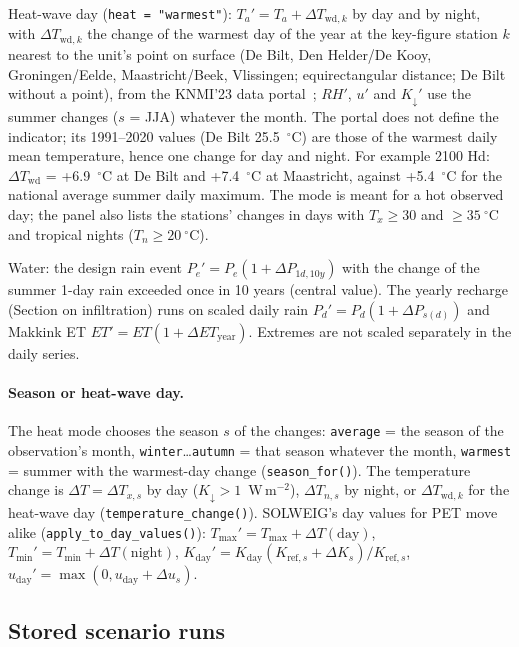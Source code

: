 \documentclass[11pt]{article}
\newcommand{\code}[1]{\texttt{#1}}
\begin{document}
Heat-wave day (\code{heat = "warmest"}): $T_a' = T_a + \Delta T_{\mathrm{wd},k}$ by day and by night, with $\Delta T_{\mathrm{wd},k}$ the change of the warmest day of the year at the key-figure station $k$ nearest to the unit's point on surface (De Bilt, Den Helder/De Kooy, Groningen/Eelde, Maastricht/Beek, Vlissingen; equirectangular distance; De Bilt without a point), from the KNMI'23 data portal~\cite{KNMI2023stations}; $RH'$, $u'$ and $K_\downarrow'$ use the summer changes ($s$ = JJA) whatever the month. The portal does not define the indicator; its 1991--2020 values (De Bilt 25.5~$^\circ$C) are those of the warmest daily mean temperature, hence one change for day and night. For example 2100 Hd: $\Delta T_{\mathrm{wd}}$ = +6.9~$^\circ$C at De Bilt and +7.4~$^\circ$C at Maastricht, against +5.4~$^\circ$C for the national average summer daily maximum. The mode is meant for a hot observed day; the panel also lists the stations' changes in days with $T_x \geq 30$ and $\geq 35~^\circ$C and tropical nights ($T_n \geq 20~^\circ$C).

Water: the design rain event $P_e' = P_e (1 + \Delta P_{1d,10y})$ with the change of the summer 1-day rain exceeded once in 10 years (central value). The yearly recharge (Section on infiltration) runs on scaled daily rain $P_d' = P_d (1 + \Delta P_{s(d)})$ and Makkink ET $ET' = ET (1 + \Delta ET_{\mathrm{year}})$. Extremes are not scaled separately in the daily series.

\paragraph{Season or heat-wave day.} The heat mode chooses the season $s$ of the changes: \code{average} = the season of the observation's month, \code{winter}\ldots\code{autumn} = that season whatever the month, \code{warmest} = summer with the warmest-day change (\code{season\_for()}). The temperature change is $\Delta T = \Delta T_{x,s}$ by day ($K_\downarrow > 1$~W\,m$^{-2}$), $\Delta T_{n,s}$ by night, or $\Delta T_{\mathrm{wd},k}$ for the heat-wave day (\code{temperature\_change()}). SOLWEIG's day values for PET move alike (\code{apply\_to\_day\_values()}): $T_{\max}' = T_{\max} + \Delta T(\text{day})$, $T_{\min}' = T_{\min} + \Delta T(\text{night})$, $K_{\mathrm{day}}' = K_{\mathrm{day}} (K_{\mathrm{ref},s} + \Delta K_s)/K_{\mathrm{ref},s}$, $u_{\mathrm{day}}' = \max(0, u_{\mathrm{day}} + \Delta u_s)$.

\subsection{Stored scenario runs}
\label{sec:climate-runs}
\end{document}
